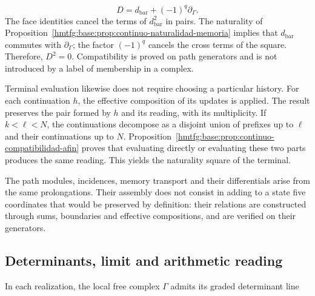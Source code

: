 \[
D=d_{\mathrm{bar}}+(-1)^q\partial_\Gamma.
\]
The face identities cancel the terms of \(d_{\mathrm{bar}}^2\) in pairs. The naturality of Proposition~\ref{hmtfg:base:prop:continuo-naturalidad-memoria} implies that \(d_{\mathrm{bar}}\) commutes with \(\partial_\Gamma\); the factor \((-1)^q\) cancels the cross terms of the square. Therefore, \(D^2=0\). Compatibility is proved on path generators and is not introduced by a label of membership in a complex.

Terminal evaluation likewise does not require choosing a particular history. For each continuation \(h\), the effective composition of its updates is applied. The result preserves the pair formed by \(h\) and its reading, with its multiplicity. If \(k<\ell<N\), the continuations decompose as a disjoint union of prefixes up to \(\ell\) and their continuations up to \(N\). Proposition~\ref{hmtfg:base:prop:continuo-compatibilidad-afin} proves that evaluating directly or evaluating these two parts produces the same reading. This yields the naturality square of the terminal.

The path modules, incidences, memory transport and their differentials arise from the same prolongations. Their assembly does not consist in adding to a state five coordinates that would be preserved by definition: their relations are constructed through sums, boundaries and effective compositions, and are verified on their generators.

\subsection{Determinants, limit and arithmetic reading}
In each realization, the local free complex \(\Gamma\) admits its graded determinant line

